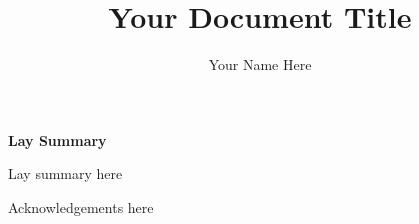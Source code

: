 \documentclass[phd,ilcc,oneside,logo]{infthesis}
\title{Your Document Title}
\author{Your Name Here}
\begin{document}
\begin{preliminary}

\maketitle

\cleardoublepage
\begin{center}
\textsf{\textbf{\LARGE Lay Summary}}
\end{center}
Lay summary here

\cleardoublepage

\begin{acknowledgements}
Acknowledgements here
\end{acknowledgements}

\standarddeclaration


\tableofcontents


\end{preliminary}




%





\end{document}
